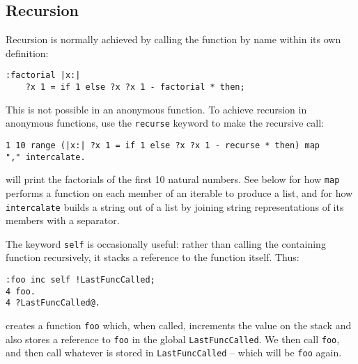 \subsection{Recursion}
Recursion is normally achieved by calling the function by name within
its own definition:
\begin{lstlisting}
:factorial |x:|
    ?x 1 = if 1 else ?x ?x 1 - factorial * then;
\end{lstlisting}
This is not possible in an anonymous function. To achieve recursion
in anonymous functions, use the
\texttt{recurse} keyword to make the recursive call:
\begin{lstlisting}
1 10 range (|x:| ?x 1 = if 1 else ?x ?x 1 - recurse * then) map
"," intercalate.
\end{lstlisting}
will print the factorials of the first 10 natural numbers. See below
for how \texttt{map} performs a function on each member of an iterable
to produce a list, and for how \texttt{intercalate} builds a string
out of a list by joining string representations of its members with
a separator.

The keyword \texttt{self} is occasionally useful: rather than calling
the containing function recursively, it stacks a reference to the
function itself. Thus:
\begin{lstlisting}
:foo inc self !LastFuncCalled;
4 foo.
4 ?LastFuncCalled@.
\end{lstlisting}
creates a function \texttt{foo} which, when called, increments the
value on the stack and also stores a reference to \texttt{foo} in
the global \texttt{LastFuncCalled}. We then call \texttt{foo},
and then call whatever is stored in \texttt{LastFuncCalled} -- which will
be \texttt{foo} again.
